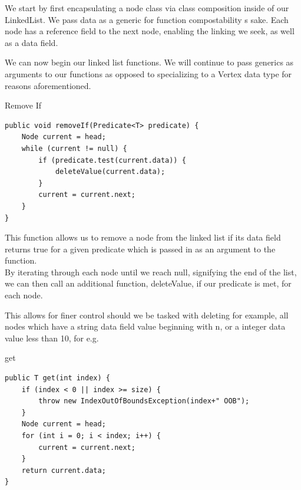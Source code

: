 \documentclass[a4paper]{article}
\begin{document}
We start by first encapsulating a node 
class via class composition inside of our LinkedList. We pass data as
a generic for function compostability s sake. Each node has a reference field 
to the next node, enabling the linking we seek, as well as a data field.

\newpage

We can now begin our linked list functions. We will continue to pass
generics as arguments to our functions as opposed to specializing to a Vertex data type
for reasons aforementioned. \\

\makeatletter
\renewcommand{\ALG@name}{Function}
\makeatother
\setcounter{algorithm}{0}

\begin{algorithm}
\caption{Remove If}\label{euclid}

\begin{verbatim}
public void removeIf(Predicate<T> predicate) {
    Node current = head;
    while (current != null) {
        if (predicate.test(current.data)) {
            deleteValue(current.data);
        }
        current = current.next;
    }
}
\end{verbatim}
\end{algorithm}

This function allows us to remove a node from the linked list 
if its data field returns true for a given predicate
which is passed in as an argument to the function. \\

By iterating through each node until we reach null, signifying
the end of the list, we can then call an additional 
function, deleteValue, if our predicate is met, for each node.

This allows for finer control should we be tasked with deleting 
for example, all nodes which have a string data field value 
beginning with n, or a integer data value less than 10, for e.g.




\begin{algorithm}
\caption{get}\label{euclid}

\begin{verbatim}
public T get(int index) {
    if (index < 0 || index >= size) {
        throw new IndexOutOfBoundsException(index+" OOB");
    }
    Node current = head;
    for (int i = 0; i < index; i++) {
        current = current.next;
    }
    return current.data;
}
\end{verbatim}

\end{algorithm}
\end{document}
